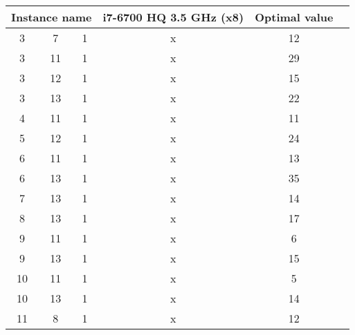 \begin{table}[H]
\centering
	\begin{tabular}{cccccc}
		\multicolumn{3}{c}{Instance name}
					& i7-6700 HQ 3.5 GHz (x8)	& Optimal value \\
		\midrule
		 3 &  7 & 1	& x							& 12 \\
		 3 & 11 & 1	& x							& 29 \\
		 3 & 12 & 1	& x							& 15 \\
		 3 & 13 & 1	& x							& 22 \\
		 4 & 11 & 1	& x							& 11 \\
		 5 & 12 & 1	& x							& 24 \\
		 6 & 11 & 1	& x							& 13 \\
		 6 & 13 & 1	& x							& 35 \\
		 7 & 13 & 1	& x							& 14 \\
		 8 & 13 & 1	& x							& 17 \\
		 9 & 11 & 1	& x							& 6 \\
		 9 & 13 & 1	& x							& 15 \\
		10 & 11 & 1	& x							& 5 \\
		10 & 13 & 1	& x							& 14 \\
		11 &  8 & 1	& x							& 12 \\
	\end{tabular}
	\label{table:LP-results:suboptimalinstances}
\end{table}

